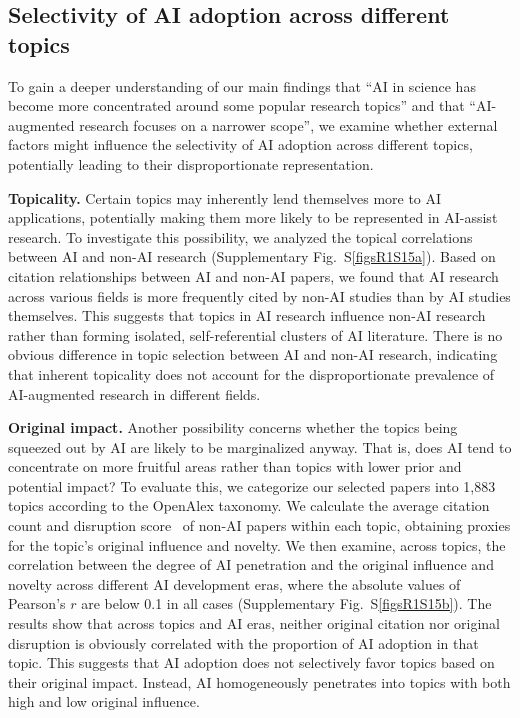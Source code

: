 \subsection{Selectivity of AI adoption across different topics}
\label{Selectivity of AI adoption on different factors}
To gain a deeper understanding of our main findings that “AI in science has become more concentrated around some popular research topics” and that “AI-augmented research focuses on a narrower scope”, we examine whether external factors might influence the selectivity of AI adoption across different topics, potentially leading to their disproportionate representation.

\textbf{Topicality.} Certain topics may inherently lend themselves more to AI applications, potentially making them more likely to be represented in AI-assist research.
To investigate this possibility, we analyzed the topical correlations between AI and non-AI research (Supplementary Fig.~S\ref{figsR1S15a}).
Based on citation relationships between AI and non-AI papers, we found that AI research across various fields is more frequently cited by non-AI studies than by AI studies themselves.
This suggests that topics in AI research influence non-AI research rather than forming isolated, self-referential clusters of AI literature.
There is no obvious difference in topic selection between AI and non-AI research, indicating that inherent topicality does not account for the disproportionate prevalence of AI-augmented research in different fields.

\textbf{Original impact.} Another possibility concerns whether the topics being squeezed out by AI are likely to be marginalized anyway.
That is, does AI tend to concentrate on more fruitful areas rather than topics with lower prior and potential impact?
To evaluate this, we categorize our selected papers into 1,883 topics according to the OpenAlex taxonomy. We calculate the average citation count and disruption score~\supercite{wu2019large,park2023papers} of non-AI papers within each topic, obtaining proxies for the topic’s original influence and novelty. We then examine, across topics, the correlation between the degree of AI penetration and the original influence and novelty across different AI development eras, where the absolute values of Pearson’s $r$ are below 0.1 in all cases (Supplementary Fig.~S\ref{figsR1S15b}).
The results show that across topics and AI eras, neither original citation nor original disruption is obviously correlated with the proportion of AI adoption in that topic.
This suggests that AI adoption does not selectively favor topics based on their original impact.
Instead, AI homogeneously penetrates into topics with both high and low original influence.

